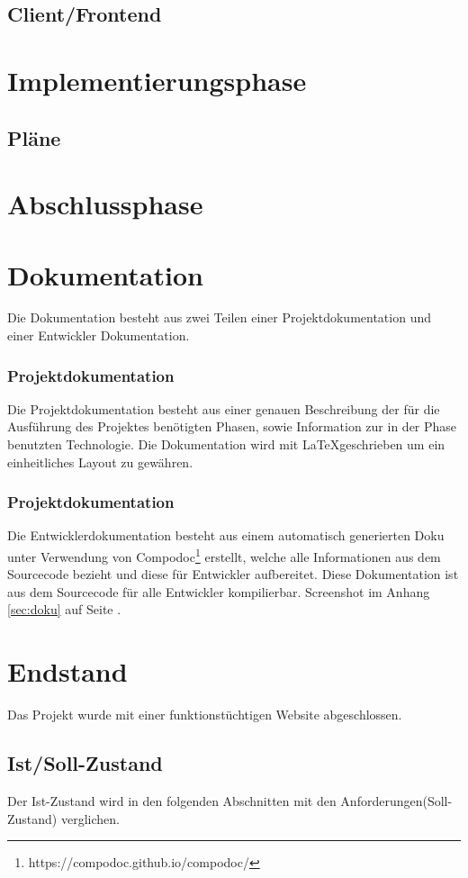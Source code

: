 \documentclass[11pt,a4paper]{article}
\begin{document}
\subsection{Client/Frontend}
\section{Implementierungsphase}
\subsection{Pläne}
\section{Abschlussphase}
\section{Dokumentation}
Die Dokumentation besteht aus zwei Teilen einer Projektdokumentation und einer Entwickler Dokumentation.
\subsubsection{Projektdokumentation}
Die Projektdokumentation besteht aus einer genauen Beschreibung der für die Ausführung des Projektes benötigten Phasen, sowie Information zur in der Phase benutzten Technologie.
Die Dokumentation wird mit \LaTeX geschrieben um ein einheitliches Layout zu gewähren.
\subsubsection{Projektdokumentation}
Die Entwicklerdokumentation besteht aus einem automatisch generierten Doku unter Verwendung von Compodoc\footnote{https://compodoc.github.io/compodoc/} erstellt, welche alle Informationen aus dem Sourcecode bezieht und diese für Entwickler aufbereitet. Diese Dokumentation ist aus dem Sourcecode für alle Entwickler kompilierbar. Screenshot im Anhang \ref{sec:doku} auf Seite \pageref{sec:doku}.
\section{Endstand}
Das Projekt wurde mit einer funktionstüchtigen Website abgeschlossen. 
\subsection{Ist/Soll-Zustand}
Der Ist-Zustand wird in den folgenden Abschnitten mit den Anforderungen(Soll-Zustand) verglichen.
\end{document}
